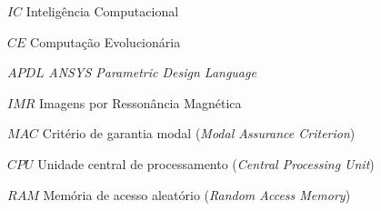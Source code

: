 \begin{siglas}
	\item[$IC$] 	Inteligência Computacional
	\item[$CE$] 	Computação Evolucionária
	\item[$APDL$] 	\textit{ANSYS Parametric Design Language}
	\item[$IMR$]	Imagens por Ressonância Magnética
	\item[$MAC$]	Critério de garantia modal (\textit{Modal Assurance Criterion})
	\item[$CPU$] 	Unidade central de processamento (\textit{Central Processing Unit})
	\item[$RAM$] 	Memória de acesso aleatório (\textit{Random Access Memory})
\end{siglas}

